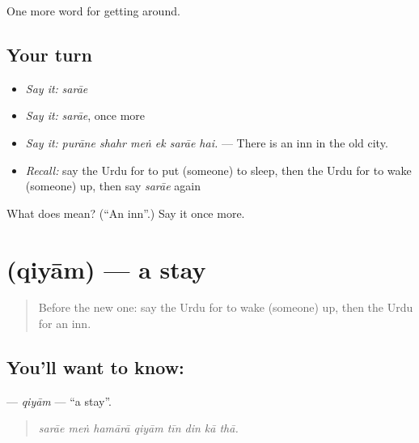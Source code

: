 \begin{grammarlens}[title={What you've built}]
One more word for getting around.
\end{grammarlens}

\subsection*{Your turn}
\begin{itemize}
\raggedright
  \item \emph{Say it:} \emph{sarāe}
  \item \emph{Say it:} \emph{sarāe}, once more
  \item \emph{Say it:} \emph{purāne shahr meṅ ek sarāe hai.} — There is an inn in the old city.
  \item \emph{Recall:} say the Urdu for to put (someone) to sleep, then the Urdu for to wake (someone) up, then say \emph{sarāe} again
\end{itemize}

\begin{tcolorbox}[breakable,colback=teal!4,colframe=teal!35!black,title={Before you move on}]
What does  mean? (\textquotedblleft{}An inn\textquotedblright{}.) Say it once more.
\end{tcolorbox}
\section[\texorpdfstring{\ur{قیام} (qiyām)}{قیام (qiyām)}]{ (qiyām) — a stay}

\label{lesson:UR-C403-qiyam}



\begin{quote}
Before the new one: say the Urdu for to wake (someone) up, then the Urdu for an inn.
\end{quote}

\subsection*{You'll want to know: }
\textbf{} — \emph{qiyām} — \textquotedblleft{}a stay\textquotedblright{}.

\begin{quote}
       
\end{quote}

\begin{quote}
\emph{sarāe meṅ hamārā qiyām tīn din kā thā.}
\end{quote}

